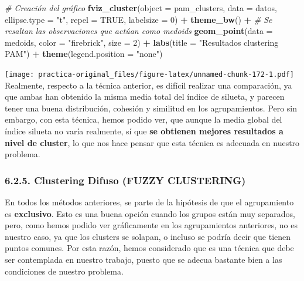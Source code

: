 \documentclass[spanish,]{article}
\newenvironment{Shaded}{\begin{snugshade}}{\end{snugshade}}
\newcommand{\KeywordTok}[1]{\textcolor[rgb]{0.13,0.29,0.53}{\textbf{#1}}}
\newcommand{\DataTypeTok}[1]{\textcolor[rgb]{0.13,0.29,0.53}{#1}}
\newcommand{\DecValTok}[1]{\textcolor[rgb]{0.00,0.00,0.81}{#1}}
\newcommand{\StringTok}[1]{\textcolor[rgb]{0.31,0.60,0.02}{#1}}
\newcommand{\CommentTok}[1]{\textcolor[rgb]{0.56,0.35,0.01}{\textit{#1}}}
\newcommand{\OtherTok}[1]{\textcolor[rgb]{0.56,0.35,0.01}{#1}}
\newcommand{\OperatorTok}[1]{\textcolor[rgb]{0.81,0.36,0.00}{\textbf{#1}}}
\newcommand{\NormalTok}[1]{#1}
\begin{document}
\begin{Shaded}
\begin{Highlighting}[]
\CommentTok{# Creación del gráfico}
\KeywordTok{fviz_cluster}\NormalTok{(}\DataTypeTok{object =}\NormalTok{ pam_clusters, }\DataTypeTok{data =}\NormalTok{ datos, }\DataTypeTok{ellipse.type =} \StringTok{"t"}\NormalTok{,}
             \DataTypeTok{repel =} \OtherTok{TRUE}\NormalTok{, }\DataTypeTok{labelsize =} \DecValTok{0}\NormalTok{) }\OperatorTok{+}
\StringTok{  }\KeywordTok{theme_bw}\NormalTok{() }\OperatorTok{+}
\StringTok{  }\CommentTok{# Se resaltan las observaciones que actúan como medoids}
\StringTok{  }\KeywordTok{geom_point}\NormalTok{(}\DataTypeTok{data =}\NormalTok{ medoids, }\DataTypeTok{color =} \StringTok{"firebrick"}\NormalTok{, }\DataTypeTok{size =} \DecValTok{2}\NormalTok{) }\OperatorTok{+}
\StringTok{  }\KeywordTok{labs}\NormalTok{(}\DataTypeTok{title =} \StringTok{"Resultados clustering PAM"}\NormalTok{) }\OperatorTok{+}
\StringTok{  }\KeywordTok{theme}\NormalTok{(}\DataTypeTok{legend.position =} \StringTok{"none"}\NormalTok{)}
\end{Highlighting}
\end{Shaded}

\texttt{[image: practica-original\_files/figure-latex/unnamed-chunk-172-1.pdf]}
Realmente, respecto a la técnica anterior, es difícil realizar una
comparación, ya que ambas han obtenido la misma media total del índice
de silueta, y parecen tener una buena distribución, cohesión y similitud
en los agrupamientos. Pero sin embargo, con esta técnica, hemos podido
ver, que aunque la media global del índice silueta no varía realmente,
sí que \textbf{se obtienen mejores resultados a nivel de cluster}, lo
que nos hace pensar que esta técnica es adecuada en nuestro problema.

\subsubsection{6.2.5. Clustering Difuso (FUZZY
CLUSTERING)}\label{clustering-difuso-fuzzy-clustering}

En todos los métodos anteriores, se parte de la hipótesis de que el
agrupamiento es \textbf{exclusivo}. Esto es una buena opción cuando los
grupos están muy separados, pero, como hemos podido ver gráficamente en
los agrupamientos anteriores, no es nuestro caso, ya que los clusters se
solapan, o incluso se podría decir que tienen puntos comunes. Por esta
razón, hemos considerado que es una técnica que debe ser contemplada en
nuestro trabajo, puesto que se adecua bastante bien a las condiciones de
nuestro problema.
\end{document}
